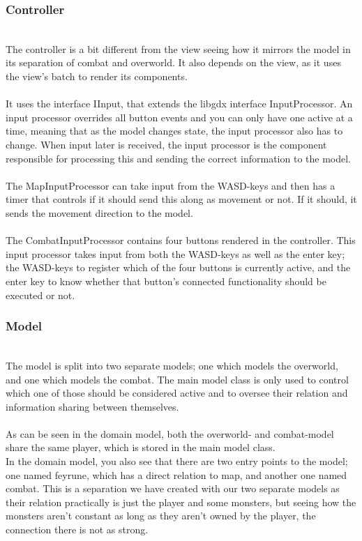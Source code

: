 \subsubsection{Controller}
\label{controller}
\\
The controller is a bit different from the view seeing how it mirrors the model in its separation of combat and overworld. It also depends on the view, as it uses the view's batch to render its components.\\
\\
It uses the interface IInput, that extends the libgdx interface InputProcessor. An input processor overrides all button events and you can only have one active at a time, meaning that as the model changes state, the input processor also has to change. When input later is received, the input processor is the component responsible for processing this and sending the correct information to the model.\\
\\
The MapInputProcessor can take input from the WASD-keys and then has a timer that controls if it should send this along as movement or not. If it should, it sends the movement direction to the model.\\
\\
The CombatInputProcessor contains four buttons rendered in the controller. This input processor takes input from both the WASD-keys as well as the enter key; the WASD-keys to register which of the four buttons is currently active, and the enter key to know whether that button's connected functionality should be executed or not.

\subsubsection{Model}
\label{model}
\\
The model is split into two separate models; one which models the overworld, and one which models the combat. The main model class is only used to control which one of those should be considered active and to oversee their relation and information sharing between themselves.\\
\\ %
As can be seen in the domain model, both the overworld- and combat-model share the same player, which is stored in the main model class.\\
In the domain model, you also see that there are two entry points to the model; one named feyrune, which has a direct relation to map, and another one named combat. This is a separation we have created with our two separate models as their relation practically is just the player and some monsters, but seeing how the monsters aren't constant as long as they aren't owned by the player, the connection there is not as strong.

